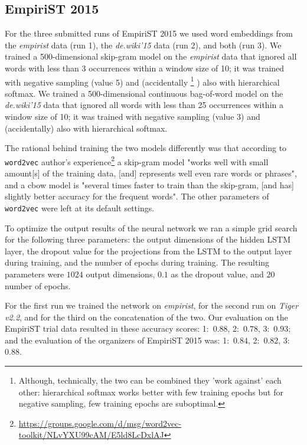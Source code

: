 \documentclass[11pt]{article}
\begin{document}
\subsection{EmpiriST 2015}
\label{ssec:case_empirist}

For the three submitted  runs of EmpiriST 2015 we used word embeddings from the \emph{empirist} data (run 1), the \emph{de.wiki'15} data (run 2), and both (run 3). 
We trained a 500-dimensional skip-gram model on the \emph{empirist} data that ignored all words with less than 3 occurrences within a window size of 10; it was trained with negative sampling (value 5) and (accidentally%
\footnote{Although, technically, the two can be combined they 'work against' each other: hierarchical softmax works better with few training epochs but for negative sampling, few training epochs are suboptimal.}%
) also with hierarchical softmax.
We trained a 500-dimensional continuous bag-of-word model on the \emph{de.wiki'15} data that ignored all words with less than 25 occurrences within a window size of 10; it was trained with negative sampling (value 3) and (accidentally) also with hierarchical softmax.

The rational behind training the two models differently was that according to \texttt{word2vec} author's experience\footnote{\url{https://groups.google.com/d/msg/word2vec-toolkit/NLvYXU99cAM/E5ld8LcDxlAJ}} a skip-gram model "works well with small amount[s] of the training data, [and] represents well even rare words or phrases", and a cbow model is "several times faster to train than the skip-gram, [and has] slightly better accuracy for the frequent words".
The other parameters of \texttt{word2vec} were left at its default settings.

To optimize the output results of the neural network we ran a simple grid search for the following three parameters: the output dimensions of the hidden LSTM layer, the dropout value for the projections from the LSTM to the output layer during training, and the number of epochs during training. The resulting parameters were $1024$ output dimensions, $0.1$ as the dropout value, and $20$ number of epochs.

For the first run we trained the network on \emph{empirist}, for the second run on \emph{Tiger v2.2}, and for the third on the concatenation of the two. %
Our evaluation on the EmpiriST trial data resulted in these accuracy scores:
1:~$0.88$, 
2:~$0.78$, 
3:~$0.93$;
and the evaluation of the organizers of EmpiriST 2015 was:
1:~$0.84$,
2:~$0.82$,
3:~$0.88$.
\end{document}
